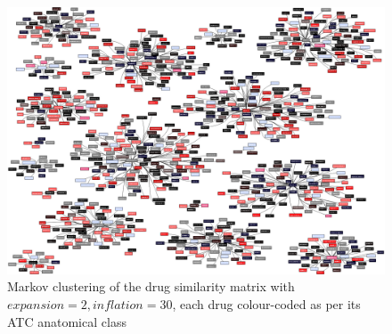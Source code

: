 \documentclass[12pt,a4paper,twoside,openright]{report}
\begin{document}
\begin{landscape}
	\begin{figure}[!htb]
		\includegraphics[height=\textwidth]{drug-cluster-2.eps}
		\caption{Markov clustering of the drug similarity matrix with $\mathit{expansion}=2, \mathit{inflation}=30$, each drug colour-coded as per its ATC anatomical class}
		\label{fig:drug-cluster-2}
	\end{figure}
	
\end{landscape}
\end{document}
